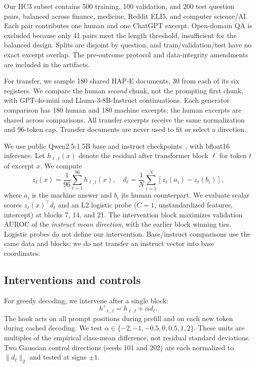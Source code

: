 \documentclass[10pt,twocolumn]{article}
\begin{document}
Our HC3 subset contains 500 training, 100 validation, and 200 test question pairs, balanced across finance, medicine, Reddit ELI5, and computer science/AI. Each pair contributes one human and one ChatGPT excerpt. Open-domain QA is excluded because only 41 pairs meet the length threshold, insufficient for the balanced design. Splits are disjoint by question, and train/validation/test have no exact excerpt overlap. The pre-outcome protocol and data-integrity amendments are included in the artifacts.

For transfer, we sample 180 shared HAP-E documents, 30 from each of its six registers. We compare the human \emph{second} chunk, not the prompting first chunk, with GPT-4o-mini and Llama-3-8B-Instruct continuations. Each generator comparison has 180 human and 180 machine excerpts; the human excerpts are shared across comparisons. All transfer excerpts receive the same normalization and 96-token cap. Transfer documents are never used to fit or select a direction.

We use public Qwen2.5-1.5B base and instruct checkpoints~\cite{qwen2024}, with bfloat16 inference. Let $h_{\ell,t}(x)$ denote the residual after transformer block $\ell$ for token $t$ of excerpt $x$. We compute
\begin{equation}
 z_\ell(x)=\frac{1}{96}\sum_{t=1}^{96}h_{\ell,t}(x),\quad
 d_\ell=\frac{1}{N}\sum_{i=1}^N[z_\ell(a_i)-z_\ell(b_i)],
\end{equation}
where $a_i$ is the machine answer and $b_i$ its human counterpart. We evaluate scalar scores $z_\ell(x)^\top d_\ell$ and an L2 logistic probe ($C=1$, unstandardized features, intercept) at blocks 7, 14, and 21. The intervention block maximizes validation AUROC of the \emph{instruct mean direction}, with the earlier block winning ties. Logistic probes do not define our intervention. Base/instruct comparisons use the same data and blocks; we do not transfer an instruct vector into base coordinates.

\subsection{Interventions and controls}
For greedy decoding, we intervene after a single block:
\begin{equation}
 h'_{\ell,t}=h_{\ell,t}+\alpha d_\ell.
\end{equation}
The hook acts on all prompt positions during prefill and on each new token during cached decoding. We test $\alpha\in\{-2,-1,-0.5,0,0.5,1,2\}$. These units are multiples of the empirical class-mean difference, not residual standard deviations. Two Gaussian control directions (seeds 101 and 202) are each normalized to $\|d_\ell\|_2$ and tested at signs $\pm1$.
\end{document}
